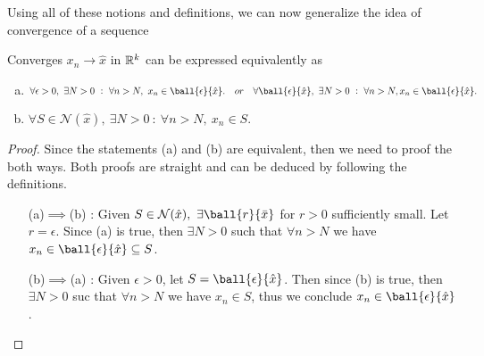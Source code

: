 Using all of these notions and definitions, we can now generalize the idea of convergence of a sequence
\begin{propbox}
	Converges $x_n \to \hat{x}$ in $\mathbb{R}^k$ can be expressed equivalently as 
	\begin{enumerate}[(a)]
		\item $\forall \epsilon>0,\ \exists N>0\ :\ \forall n>N,\ x_n \in \ball{\epsilon}{\hat{x}}. \quad or \quad \forall \ball{\epsilon}{\hat{x}},\ \exists N>0\ :\ \forall n>N, x_n \in \ball{\epsilon}{\hat{x}}. $
		\item $\forall S \in \mathcal{N}(\hat{x}),\ \exists N>0\ :\ \forall n>N,\ x_n \in S.$
	\end{enumerate}
\end{propbox}

\begin{proof}
	Since the statements (a) and (b) are equivalent, then we need to proof the both ways. Both proofs are straight and can be deduced by following the definitions.
	\begin{itemize}
		\item [(a)$\implies$(b)]: Given $S\in \mathcal{N}(\hat{x}),\ \exists \ball{r}{\bar{x}}$ for $r>0$ sufficiently small. Let $r=\epsilon$. Since (a) is true, then $\exists N>0$ such that $\forall n>N$ we have $x_n \in \ball{\epsilon}{\hat{x}} \subseteq S$.
		\item [(b)$\implies$(a)]: Given $\epsilon>0$, let $S = \ball{\epsilon}{\hat{x}}$. Then since (b) is true, then $\exists N>0$ suc that $\forall n>N$ we have $x_n \in S$, thus we conclude $x_n \in \ball{\epsilon}{\hat{x}}$. 
	\end{itemize}
\end{proof}



